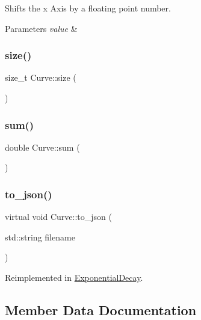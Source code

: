 Shifts the x Axis by a floating point number.


\begin{DoxyParams}{Parameters}
{\em value} & \\
\hline
\end{DoxyParams}
\mbox{\label{class_curve_add93ea6b8418185dcc647273fd85bcef}} 
\subsubsection{\texorpdfstring{size()}{size()}}
{\footnotesize\ttfamily size\+\_\+t Curve\+::size (\begin{DoxyParamCaption}{ }\end{DoxyParamCaption})}

\mbox{\label{class_curve_a6d554f1ab79e7b741eea5abded25874b}} 
\subsubsection{\texorpdfstring{sum()}{sum()}}
{\footnotesize\ttfamily double Curve\+::sum (\begin{DoxyParamCaption}{ }\end{DoxyParamCaption})}

\mbox{\label{class_curve_a6c16b3a6a4f4bd9540780d4e68d90545}} 
\subsubsection{\texorpdfstring{to\+\_\+json()}{to\_json()}}
{\footnotesize\ttfamily virtual void Curve\+::to\+\_\+json (\begin{DoxyParamCaption}\item[{std\+::string}]{filename }\end{DoxyParamCaption})\hspace{0.3cm}{\ttfamily [virtual]}}



Reimplemented in \hyperlink{class_exponential_decay_ab26d8a17274fe3723bc3c19a485c45db}{Exponential\+Decay}.



\subsection{Member Data Documentation}
\mbox{\label{class_curve_aaabf36e61b8b305b761587e4cc9737e3}} 
